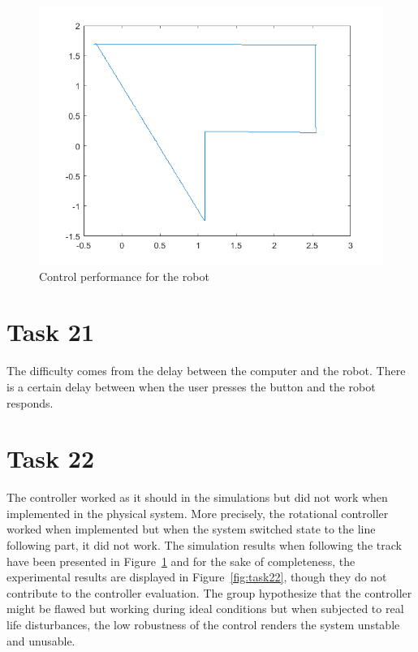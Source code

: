 \documentclass[a4paper,12pt,oneside,onecolumn]{article} %
\begin{document}
\begin{center}
    \begin{figure}[H]
      \centering
      \includegraphics[scale=0.5]{../matlab/images/task19_cont.png}
      \caption{Control performance for the robot}
      \label{fig:task19_cont}
    \end{figure}
\end{center}

\section*{Task 21}

The difficulty comes from the delay between the computer and the
robot. There is a certain delay between when the user presses the button
and the robot responds.

\section*{Task 22}
The controller worked as it should in the simulations but did not work
when implemented in the physical system. More precisely, the rotational
controller worked when implemented but when the system switched state to
the line following part, it did not work. The simulation results when
following the track have been presented in Figure~\ref{fig:task19_cont}
and for the sake of completeness, the experimental results are
displayed in Figure~\ref{fig:task22}, though they do not contribute to the controller evaluation.
The group hypothesize that the controller might be flawed but working
during ideal conditions but when subjected to real life disturbances,
the low robustness of the control renders the system unstable and
unusable.
\end{document}
